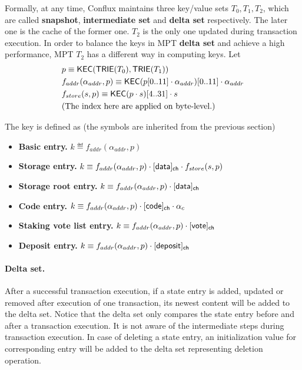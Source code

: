 Formally, at any time, Conflux maintains three key/value sets $T_0,T_1,T_2$, which are called {\bf snapshot}, {\bf intermediate set} and {\bf delta set} respectively. The later one is the cache of the former one. $T_2$ is the only one updated during transaction execution. In order to balance the keys in MPT {\bf delta set} and achieve a high performance, MPT $T_2$ has a different way in computing keys. Let 
%
\begin{align}
	&p\equiv\mathsf{KEC}(\mathsf{TRIE}(T_0),\mathsf{TRIE}(T_1)) \\
	&f_{addr}(\alpha_{addr},p)\equiv\mathsf{KEC}(p[0..11]\cdot \alpha_{addr})[0..11]\cdot \alpha_{addr} \\ 
	&f_{store}(s,p)\equiv \mathsf{KEC}(p\cdot s)[4..31]\cdot s\\
	&\text{(The index here are applied on byte-level.)} \notag
\end{align}

The key is defined as (the symbols are inherited from the previous section)
\begin{itemize}[nosep]
	\item {\bf Basic entry.} $k\eqdef f_{addr}(\alpha_{addr},p)$
	\item {\bf Storage entry.} $k\equiv f_{addr}(\alpha_{addr},p)\cdot [{\sf data}]_{\sf ch}\cdot f_{store}(s,p)$
	\item {\bf Storage root entry.} $k\equiv f_{addr}(\alpha_{addr},p)\cdot [{\sf data}]_{\sf ch}$
	\item {\bf Code entry.} $k\equiv f_{addr}(\alpha_{addr},p)\cdot [{\sf code}]_{\sf ch}\cdot \alpha_c$
	\item {\bf Staking vote list entry.} $k\equiv f_{addr}(\alpha_{addr},p)\cdot [{\sf vote}]_{\sf ch}$
	\item {\bf Deposit entry.} $k\equiv f_{addr}(\alpha_{addr},p)\cdot [{\sf deposit}]_{\sf ch}$
 
\end{itemize}

\paragraph{Delta set.}

After a successful transaction execution, if a state entry is added, updated or removed after execution of one transaction, its newest content will be added to the delta set. Notice that the delta set only compares the state entry before and after a transaction execution. It is not aware of the intermediate steps during transaction execution. 
%
%
%
In case of deleting a state entry, an initialization value for corresponding entry will be added to the delta set representing deletion operation. 

